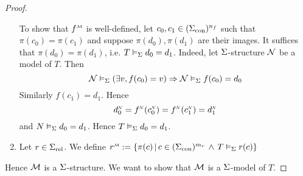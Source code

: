 \begin{proof}
\begin{enumerate}
        To show that $\mmintp{f}$ is well-defined,
        let $c_0,c_1 \in ({\Sigma}_\mathrm{con})^{n_f}$ 
        such that $\pi(c_0) = \pi(c_1)$ and
        suppose $\pi(d_0),\pi(d_1)$ are their images.
        It suffices that $\pi(d_0) = \pi(d_1)$, i.e. $T \vDash_{\Sigma} d_0 = d_1$.
        Indeed, let $\Sigma$-structure $\mathcal{N}$ be a model of $T$.
        Then
        \[
            \mathcal{N} \vDash_{\Sigma} (\exists v, f(c_0) = v) 
            \Rightarrow 
            \mathcal{N} \vDash_{\Sigma} f(c_0) = d_0
        \]
        Similarly $f(c_1) = d_1$. Hence 
        \[\modintp{\NN}{d_0} = \modintp{\NN}{f}(\modintp{\NN}{c_0})
        = \modintp{\NN}{f}(\modintp{\NN}{c_1}) = \modintp{\NN}{d_1}\]
        and $N \vDash_{\Sigma} d_0 = d_1$.
        Hence $T \vDash_{\Sigma} d_0 = d_1$.
        \item Let $r \in {\Sigma}_\mathrm{rel}$. 
        We define $\mmintp{r} := 
        \set{\pi(c) \st c \in (\const{\Si})^{m_r} \AND T \modelsi r(c)}$
    \end{enumerate}
    Hence $\mathcal{M}$ is a $\Sigma$-structure.
    We want to show that $\mathcal{M}$ is a $\Sigma$-model of $T$.


\end{proof}
